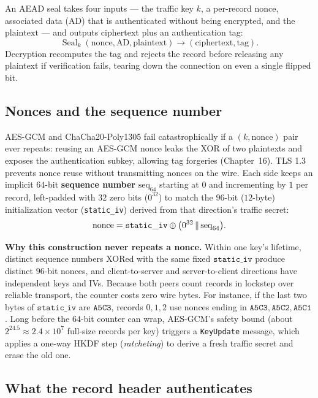 An AEAD seal takes four inputs --- the traffic key $k$, a per-record $\text{nonce}$,
associated data ($\mathrm{AD}$) that is authenticated without being encrypted, and
the $\text{plaintext}$ --- and outputs ciphertext plus an authentication tag:
\[
\operatorname{Seal}_k(\text{nonce}, \mathrm{AD}, \text{plaintext})
\longrightarrow (\text{ciphertext}, \text{tag}).
\]
Decryption recomputes the tag and rejects the record before releasing any plaintext
if verification fails, tearing down the connection on even a single flipped bit.

\subsection{Nonces and the sequence number}

AES-GCM and ChaCha20-Poly1305 fail catastrophically if a $(k, \text{nonce})$ pair
ever repeats: reusing an AES-GCM nonce leaks the XOR of two plaintexts and exposes
the authentication subkey, allowing tag forgeries (Chapter~16). TLS 1.3 prevents
nonce reuse without transmitting nonces on the wire. Each side keeps an implicit
$64$-bit \textbf{sequence number} $\mathrm{seq}_{64}$ starting at $0$ and
incrementing by $1$ per record, left-padded with $32$ zero bits ($0^{32}$) to match
the $96$-bit ($12$-byte) initialization vector (\texttt{static\_iv}) derived from
that direction's traffic secret:
\[
\text{nonce} = \mathtt{static\_iv} \oplus \bigl(0^{32} \,\|\, \mathrm{seq}_{64}\bigr).
\]

\begin{focusbox}
\textbf{Why this construction never repeats a nonce.} Within one key's lifetime,
distinct sequence numbers XORed with the same fixed $\mathtt{static\_iv}$ produce
distinct $96$-bit nonces, and client-to-server and server-to-client directions have
independent keys and IVs. Because both peers count records in lockstep over
reliable transport, the counter costs zero wire bytes. For instance, if the last
two bytes of $\mathtt{static\_iv}$ are $\mathtt{A5C3}$, records $0, 1, 2$ use nonces
ending in $\mathtt{A5C3}, \mathtt{A5C2}, \mathtt{A5C1}$. Long before the $64$-bit
counter can wrap, AES-GCM's safety bound (about $2^{24.5} \approx 2.4 \times 10^7$
full-size records per key) triggers a \texttt{KeyUpdate} message, which applies a
one-way HKDF step (\emph{ratcheting}) to derive a fresh traffic secret and erase the
old one.
\end{focusbox}

\subsection{What the record header authenticates}

